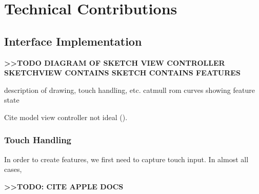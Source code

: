 \chapter{Technical Contributions}

\section{Interface Implementation}\label{interface-implementation}

\textbf{\textgreater{}\textgreater{}TODO DIAGRAM OF SKETCH VIEW
CONTROLLER SKETCHVIEW CONTAINS SKETCH CONTAINS FEATURES}

description of drawing, touch handling, etc. catmull rom curves showing
feature state

Cite model view controller not ideal (\citet{veit2003model}).

\subsection{Touch Handling}\label{touch-handling}

In order to create features, we first need to capture touch input. In
almost all cases,

\textbf{\textgreater{}\textgreater{}TODO: CITE APPLE DOCS}
